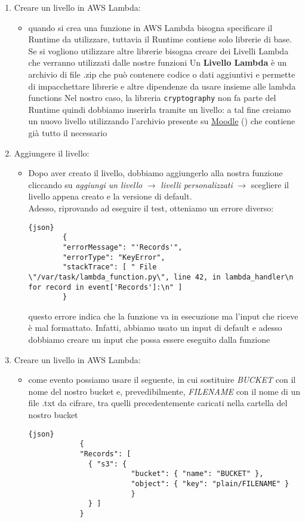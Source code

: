 \begin{enumerate}
    \item Creare un livello in AWS Lambda:
    \begin{itemize}
        \item quando si crea una funzione in AWS Lambda bisogna specificare il Runtime da utilizzare, tuttavia il Runtime contiene solo librerie di base. Se si vogliono utilizzare altre librerie bisogna creare dei Livelli Lambda che verranno utilizzati dalle nostre funzioni
        Un \textbf{Livello Lambda} è un archivio di file .zip che può contenere codice o dati aggiuntivi e permette di impacchettare librerie e altre dipendenze da usare insieme alle lambda functions
        Nel nostro caso, la libreria \verb|cryptography| non fa parte del Runtime quindi dobbiamo inserirla tramite un livello: a tal fine creiamo un nuovo livello utilizzando l'archivio presente su \href{https://elearning.di.unipi.it/enrol/index.php?id=334}{Moodle} () che contiene già tutto il necessario
    \end{itemize}

    \item Aggiungere il livello:
    \begin{itemize}
        \item Dopo aver creato il livello, dobbiamo aggiungerlo alla nostra funzione cliccando su \textit{aggiungi un livello} $\rightarrow$ \textit{livelli personalizzati} $\rightarrow$ scegliere il livello appena creato e la versione di default.\\
        Adesso, riprovando ad eseguire il test, otteniamo un errore diverso:
        \begin{lstlisting}{json}
        { 
        "errorMessage": "'Records'",
        "errorType": "KeyError",
        "stackTrace": [ " File \"/var/task/lambda_function.py\", line 42, in lambda_handler\n for record in event['Records']:\n" ]
        }
        \end{lstlisting}
        questo errore indica che la funzione va in esecuzione ma l'input che riceve è mal formattato. Infatti, abbiamo usato un input di default e adesso dobbiamo creare un input che possa essere eseguito dalla funzione
    \end{itemize}

    \item Creare un livello in AWS Lambda:
    \begin{itemize}
        \item come evento possiamo usare il seguente, in cui sostituire \textit{BUCKET} con il nome del nostro bucket e, prevedibilmente, \textit{FILENAME} con il nome di un file .txt da cifrare, tra quelli precedentemente caricati nella cartella  del nostro bucket
        \begin{lstlisting}{json}
            {
            "Records": [
              { "s3": { 
                        "bucket": { "name": "BUCKET" },
                        "object": { "key": "plain/FILENAME" } 
                        } 
              } ]
            }
        \end{lstlisting}
    \end{itemize}


\end{enumerate}
